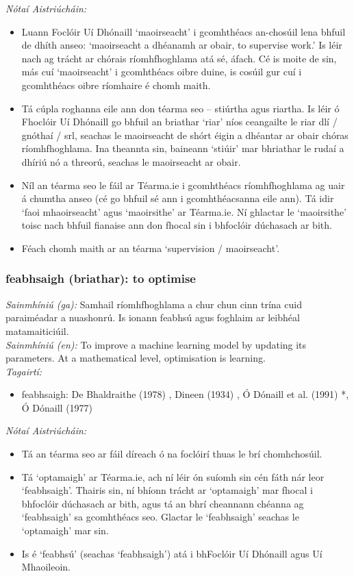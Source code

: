  \noindent \textit{Nótaí Aistriúcháin:}
\begin{itemize}
	\item Luann Foclóir Uí Dhónaill `maoirseacht' i gcomhthéacs an-chosúil lena bhfuil de dhíth anseo: `maoirseacht a dhéanamh ar obair, to supervise work.' Is léir nach ag trácht ar chórais ríomhfhoghlama atá sé, áfach. Cé is moite de sin, más cuí `maoirseacht' i gcomhthéacs oibre duine, is cosúil gur cuí i gcomhthéacs oibre ríomhaire é chomh maith.
	\item Tá cúpla roghanna eile ann don téarma seo -- stiúrtha agus riartha. Is léir ó Fhoclóir Uí Dhónaill go bhfuil an briathar `riar' níos ceangailte le riar dlí / gnóthaí / srl, seachas le maoirseacht de shórt éigin a dhéantar ar obair chóras ríomhfhoghlama. Ina theannta sin, baineann `stiúir' mar bhriathar le rudaí a dhíriú nó a threorú, seachas le maoirseacht ar obair.
	\item Níl an téarma seo le fáil ar Téarma.ie i gcomhthéacs ríomhfhoghlama ag uair á chumtha anseo (cé go bhfuil sé ann i gcomhthéacsanna eile ann). Tá idir `faoi mhaoirseacht' agus `maoirsithe' ar Téarma.ie. Ní ghlactar le `maoirsithe' toisc nach bhfuil fianaise ann don fhocal sin i bhfoclóir dúchasach ar bith.
	\item Féach chomh maith ar an téarma `supervision / maoirseacht'.
\end{itemize}


\subsubsection*{feabhsaigh (briathar): to optimise}
 \noindent \textit{Sainmhíniú (ga):} Samhail ríomhfhoghlama a chur chun cinn trína cuid paraiméadar a nuashonrú. Is ionann feabhsú agus foghlaim ar leibhéal matamaiticiúil.
\\
 \noindent \textit{Sainmhíniú (en):} To improve a machine learning model by updating its parameters. At a mathematical level, optimisation is learning.
\\
 \noindent \textit{Tagairtí:}
\begin{itemize}
	\item feabhsaigh: De Bhaldraithe (1978) \cite{de-bhaldraithe}, Dineen (1934) \cite{dineen}, Ó Dónaill et al. (1991) \cite{focloir-beag}*, Ó Dónaill (1977) \cite{odonaill}
\end{itemize}

 \noindent \textit{Nótaí Aistriúcháin:}
\begin{itemize}
	\item Tá an téarma seo ar fáil díreach ó na foclóirí thuas le brí chomhchosúil.
	\item Tá `optamaigh' ar Téarma.ie, ach ní léir ón suíomh sin cén fáth nár leor `feabhsaigh'. Thairis sin, ní bhíonn trácht ar `optamaigh' mar fhocal i bhfoclóir dúchasach ar bith, agus tá an bhrí cheannann chéanna ag `feabhsaigh' sa gcomhthéacs seo. Glactar le `feabhsaigh' seachas le `optamaigh' mar sin.
	\item Is é `feabhsú' (seachas `feabhsaigh') atá i bhFoclóir Uí Dhónaill agus Uí Mhaoileoin.
\end{itemize}


